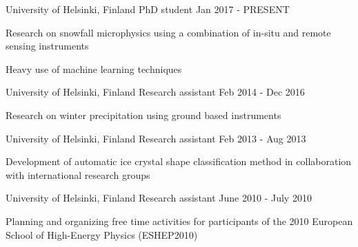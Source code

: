 

\begin{cventries}

  \cventry
    {University of Helsinki, Finland} %
    {PhD student} %
    {} %
    {Jan 2017 - PRESENT} %
    {
      \begin{cvitems} %
        \item {Research on snowfall microphysics using a combination of in-situ and remote sensing instruments}
        \item {Heavy use of machine learning techniques}
      \end{cvitems}
    }

  \cventry
    {University of Helsinki, Finland} %
    {Research assistant} %
    {} %
    {Feb 2014 - Dec 2016} %
    {
      \begin{cvitems} %
        \item {Research on winter precipitation using ground based instruments}
      \end{cvitems}
    }

  \cventry
    {University of Helsinki, Finland} %
    {Research assistant} %
    {} %
    {Feb 2013 - Aug 2013} %
    {
      \begin{cvitems} %
        \item {Development of automatic ice crystal shape classification method in collaboration with international research groups}
      \end{cvitems}
    }

  \cventry
    {University of Helsinki, Finland} %
    {Research assistant} %
    {} %
    {June 2010 - July 2010} %
    {
      \begin{cvitems} %
        \item {Planning and organizing free time activities for participants of the 2010 European School of High-Energy Physics (ESHEP2010)}
      \end{cvitems}
}

\end{cventries}
